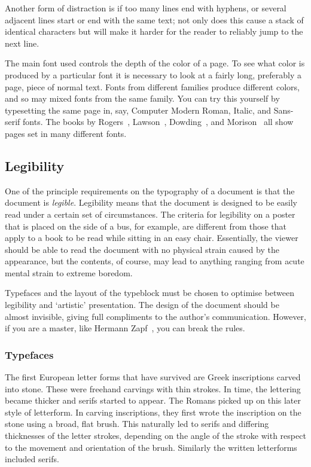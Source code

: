 \documentclass[10pt,letterpaper,extrafontsizes]{memoir}
\begin{document}
    Another form of distraction is if too many lines end with hyphens, or
several adjacent lines start or end with the same text; not only does
this cause a stack of identical characters but will make it harder for 
the reader to reliably jump to the next line.

    The main font used controls the depth of the color of a page. To
see what color is produced by a particular font it is necessary to look
at a fairly long, preferably a page, piece of normal text. Fonts from
different families produce different colors, and so may mixed fonts from 
the same family. You can try this yourself by typesetting the same page
in, say, Computer Modern Roman, Italic, and Sans-serif fonts.
The books by Rogers~\autocite{ROGERS43}, Lawson~\autocite{LAWSON90},
Dowding~\autocite{DOWDING98}, and 
Morison~\autocite{MORISON99} all show pages set in many different fonts.

    

\subsection{Legibility}

    One of the principle requirements on the typography of a document is 
that the document is \emph{legible}. Legibility 
means that the document 
is designed to be easily read under a certain set of circumstances. 
The criteria for
legibility on a poster that is placed on the side of a bus, for example, are
different from those that apply to a book to be read while sitting in an
easy chair. Essentially, the viewer should be able to read the document
with no physical strain caused by the appearance, but the contents, 
of course, may lead to anything ranging from acute mental strain to 
extreme boredom.

    Typefaces and the layout of the 
typeblock must be 
chosen to optimise between legibility and `artistic' presentation. 
The design of the document should be almost invisible, giving full 
compliments to the author's communication. However, if you are a master, 
like Hermann Zapf~\autocite{ZAPF00}, you can break the rules.

    

\subsubsection{Typefaces}

    The first European letter forms that have survived are Greek inscriptions
carved into stone. These were freehand carvings with thin strokes. In time,
the lettering became thicker and serifs started to appear. The Romans
picked up on this later style of letterform. In carving inscriptions, they
first wrote the inscription on the stone using a broad, flat brush. This
naturally led to serifs and differing thicknesses of the letter strokes,
depending on the angle of the stroke with respect to the movement and
orientation of the brush. Similarly the written letterforms included
serifs.
\end{document}
